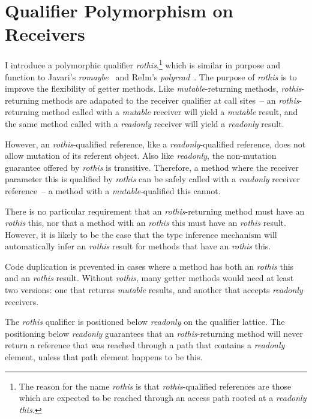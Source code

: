 \section{Qualifier Polymorphism on Receivers}
\label{sec-poly-qual}

I introduce a polymorphic qualifier {\em rothis},\footnote{
	The reason for the name {\em rothis} is that {\em rothis}-qualified
	references are those which are expected to be reached through an access path
	rooted at a {\em readonly this.}
}
which is similar in purpose and function to
Javari's {\em romaybe}~\cite{javari} and ReIm's {\em polyread}~\cite{reim}.
The purpose of {\em rothis} is to improve the flexibility of getter methods.
Like {\em mutable}-returning methods, {\em rothis}-returning methods are adapated to
the receiver qualifier at call sites~--
an {\em rothis}-returning method called with a {\em mutable}
receiver will yield a {\em mutable} result, and the same method called
with a {\em readonly} receiver will yield a {\em readonly} result.

However, an {\em rothis}-qualified reference, like a {\em readonly}-qualified reference,
does not allow mutation of its referent object.
Also like {\em readonly}, the non-mutation guarantee offered by {\em rothis}
is transitive.
Therefore, a method where the receiver parameter {\cd this} is qualified
by {\em rothis} can be safely called with a {\em readonly} receiver reference~--
a method with a {\em mutable}-qualified {\cd this} cannot.

There is no particular requirement that an {\em rothis}-returning method
must have an {\em rothis} {\cd this}, nor that a method with an {\em rothis} {\cd this}
must have an {\em rothis} result.
However, it is likely to be the case that the type inference mechanism
will automatically infer an {\em rothis} result for methods that have an {\em rothis} {\cd this}.

Code duplication is prevented in cases where a method has both an {\em rothis} {\cd this}
and an {\em rothis} result. Without {\em rothis}, many getter methods would need at least two versions:
one that returns {\em mutable} results, and another that accepts {\em readonly} receivers.


The {\em rothis} qualifier is positioned below {\em readonly} on the qualifier lattice.
The positioning below {\em readonly} guarantees that an {\em rothis}-returning method
will never return a reference that was reached through a path that contains
a {\em readonly} element, unless that path element happens to be {\cd this}.

